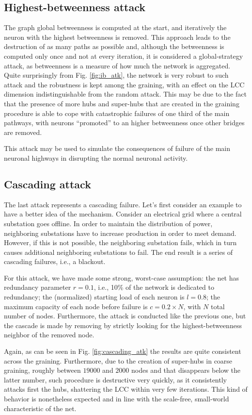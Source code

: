 \subsection{Highest-betweenness attack}
The graph global betweenness is computed at the start, and iteratively the neuron with the highest betweenness is removed. This approach leads to the destruction of as many paths as possible and, although the betweenness is computed only once and not at every iteration, it is considered a global-strategy attack, as betweenness is a measure of how much the network is aggregated. Quite surprisingly from Fig. \ref{fig:ib_atk}, the network is very robust to such attack and the robustness is kept among the graining, with an effect on the LCC dimension indistinguishable from the random attack. This may be due to the fact that the presence of more hubs and super-hubs that are created in the graining procedure is able to cope with catastrophic failures of one third of the main pathways, with neurons ``promoted'' to an higher betweenness once other bridges are removed.

This attack may be used to simulate the consequences of failure of the main neuronal highways in disrupting the normal neuronal activity.
	
\subsection{Cascading attack}
The last attack represents a cascading failure. Let's first consider an example to have a better idea of the mechanism. Consider an electrical grid where a central substation goes offline. In order to maintain the distribution of power, neighboring substations have to increase production in order to meet demand. However, if this is not possible, the neighboring substation fails, which in turn causes additional neighboring substations to fail. The end result is a series of cascading failures, i.e., a blackout.

For this attack, we have made some strong, worst-case assumption: the net has redundancy parameter $r = 0.1$, i.e., 10\% of the network is dedicated to redundancy; the (normalized) starting load of each neuron is $l=0.8$; the maximum capacity of each node before failure is $c = 0.2 \times N$, with $N$ total number of nodes. Furthermore, the attack is conducted like the previous one, but the cascade is made by removing by strictly looking for the highest-betweenness neighbor of the removed node.

Again, as can be seen in Fig. \ref{fig:cascading_atk} the results are quite consistent across the graining. Furthermore, due to the creation of super-hubs in coarse graining, roughly between $19000$ and $2000$ nodes and that disappears below the latter number, such procedure is destructive very quickly, as it consistently attacks first the hubs, shattering the LCC within very few iterations. This kind of behavior is nonetheless expected and in line with the scale-free, small-world characteristic of the net.


